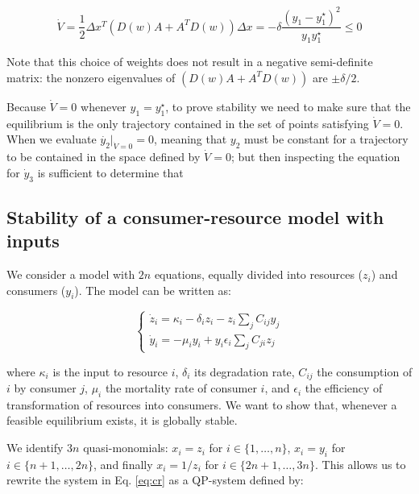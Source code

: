 \documentclass{article}
\begin{document}
\begin{equation}
\dot{V} = \frac{1}{2} \Delta x^T (D(w) A + A^T D(w)) \Delta x =  - \delta \frac{(y_1 - y_1^\star)^2}{y_1 y_1^\star} \leq 0
\end{equation}

Note that this choice of weights does not result in a negative
semi-definite matrix: the nonzero eigenvalues of \((D(w) A + A^T D(w))\)
are \(\pm \delta / 2\).

Because \(\dot{V} = 0\) whenever \(y_1 = y_1^\star\), to prove stability
we need to make sure that the equilibrium is the only trajectory
contained in the set of points satisfying \(\dot{V} = 0\). When we
evaluate \(\dot{y_2}|_{\dot{V} = 0} = 0\), meaning that \(y_2\) must be
constant for a trajectory to be contained in the space defined by
\(\dot{V} = 0\); but then inspecting the equation for \(\dot{y}_3\) is
sufficient to determine that

\hypertarget{stability-of-a-consumer-resource-model-with-inputs}{%
\subsection{Stability of a consumer-resource model with
inputs}\label{stability-of-a-consumer-resource-model-with-inputs}}

We consider a model with \(2n\) equations, equally divided into
resources (\(z_i\)) and consumers (\(y_i\)). The model can be written
as:

\begin{equation}
\label{eq:cr}
\begin{cases}
\dot{z}_i = \kappa_i - \delta_i z_i - z_i \sum_j C_{ij} y_j\\
\dot{y}_i = - \mu_i y_i + y_i \epsilon_i \sum_j C_{ji} z_j
\end{cases}
\end{equation}

where \(\kappa_i\) is the input to resource \(i\), \(\delta_i\) its
degradation rate, \(C_{ij}\) the consumption of \(i\) by consumer \(j\),
\(\mu_i\) the mortality rate of consumer \(i\), and \(\epsilon_i\) the
efficiency of transformation of resources into consumers. We want to
show that, whenever a feasible equilibrium exists, it is globally
stable.

We identify \(3n\) quasi-monomials: \(x_i = z_i\) for
\(i \in \{1, \ldots, n\}\), \(x_i = y_i\) for
\(i \in \{n + 1, \ldots, 2 n\}\), and finally \(x_i = 1 / z_i\) for
\(i \in \{2 n + 1, \ldots, 3 n\}\). This allows us to rewrite the system
in Eq. \ref{eq:cr} as a QP-system defined by:
\end{document}
